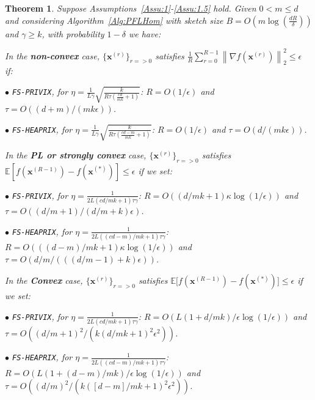 \documentclass[11pt]{article}
\newtheorem{theorem}{Theorem}
\begin{document}
\begin{theorem}\label{thm:homog_case}
Suppose Assumptions~\ref{Assu:1}-\ref{Assu:1.5} hold. 
Given $0<m\leq d$ and considering Algorithm~\ref{Alg:PFLHom} with sketch size $B=O\left(m\log\left(\frac{d R}{\delta}\right)\right)$ and $\gamma\geq k$, with probability $1-\delta$ we have: 

In the \textbf{non-convex} case, $\{ {\boldsymbol{x}}^{(r)}\}_{r=>0}$ satisfies  $\frac{1}{R}\sum_{r=0}^{R-1}\left\|\nabla f({\boldsymbol{x}}^{(r)})\right\|_2^2\leq {\epsilon}$ if: 
 
\noindent $\bullet$ \texttt{FS-PRIVIX}, for $\eta=\frac{1}{L\gamma}\sqrt{\frac{k}{R\tau\left(\frac{c d}{m k}+1\right)}}$: $R=O\left(1/\epsilon\right)$ and $\tau=O\left(( d+m)/(mk\epsilon)\right)$.

\noindent $\bullet$ \texttt{FS-HEAPRIX}, for $\eta=\frac{1}{L\gamma}\sqrt{\frac{k}{R\tau\left(\frac{cd-m}{mk}+1\right)}}$: $R=O\left(1/\epsilon\right)$ and $\tau=O\left(d/(mk\epsilon)\right)$.

In the \textbf{PL or strongly convex} case, $\{ {\boldsymbol{x}}^{(r)}\}_{r=>0}$ satisfies $\mathbb{E}[f({\boldsymbol{x}}^{(R-1)})-f({\boldsymbol{x}}^{(*)})]\leq \epsilon$ if  we set:  

\noindent $\bullet$ \texttt{FS-PRIVIX}, for $\eta=\frac{1}{2L(cd/mk+1)\tau\gamma}$: $R=O\left(\left(d/mk+1\right)\kappa\log\left(1/\epsilon\right)\right)$ and $\tau=O\left((d/m+1)\Big/\left(d/m+k\right)\epsilon\right)$.

\noindent $\bullet$ \texttt{FS-HEAPRIX}, for $\eta=\frac{1}{2L\left((cd-m)/mk+1\right)\tau\gamma}$: $R = O\left(\left((d-m)/mk+1\right)\kappa\log\left(1/\epsilon\right)\right)$ and $ \tau =O\left(d/m\Big/\left(\left((d/m-1)+k\right)\epsilon\right)\right)$.


In the \textbf{Convex} case, $\{ {\boldsymbol{x}}^{(r)}\}_{r=>0}$ satisfies $ \mathbb{E}\Big[f({\boldsymbol{x}}^{(R-1)})-f({\boldsymbol{x}}^{(*)})\Big]\leq \epsilon$ if we set:  

\noindent $\bullet$ \texttt{FS-PRIVIX}, for $\eta=\frac{1}{2L(cd/mk+1)\tau\gamma}$: $R =O\left(L\left(1+d/mk\right)/\epsilon\log\left(1/\epsilon \right)\right)$ and
$\tau=O\left(\left(d/m+1\right)^2/(k\left(d/m k+1\right)^2\epsilon^2)\right)$.

\noindent $\bullet$ \texttt{FS-HEAPRIX}, for $\eta=\frac{1}{2L\left((cd-m)/mk+1\right)\tau\gamma}$:   $R =O\left(L\left(1+(d-m)/mk\right)/\epsilon\log\left(1/\epsilon \right)\right)$ and $\tau=O\left((d/m)^2/\left(k\left([d-m]/mk+1\right)^2\epsilon^2\right)\right)$.
\end{theorem}
\end{document}
